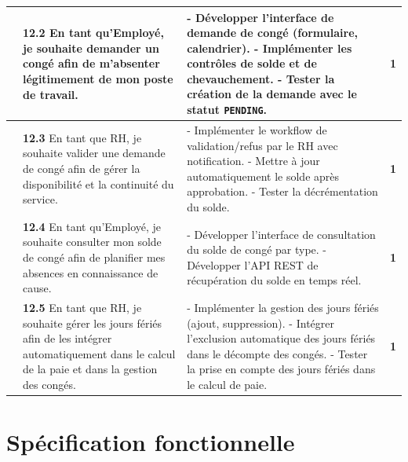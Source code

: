 \begin{small}
\begin{longtable}{|>{\raggedright\arraybackslash}p{2.8cm}|>{\raggedright\arraybackslash}p{6.2cm}|>{\raggedright\arraybackslash}p{6.2cm}|c|}
& \textbf{12.2} En tant qu'Employé, je souhaite demander un congé afin de m'absenter légitimement de mon poste de travail.
& - Développer l'interface de demande de congé (formulaire, calendrier).\newline
- Implémenter les contrôles de solde et de chevauchement.\newline
- Tester la création de la demande avec le statut \texttt{PENDING}.
& \textbf{1} \\ \cline{2-4}

& \textbf{12.3} En tant que RH, je souhaite valider une demande de congé afin de gérer la disponibilité et la continuité du service.
& - Implémenter le workflow de validation/refus par le RH avec notification.\newline
- Mettre à jour automatiquement le solde après approbation.\newline
- Tester la décrémentation du solde.
& \textbf{1} \\ \cline{2-4}

& \textbf{12.4} En tant qu'Employé, je souhaite consulter mon solde de congé afin de planifier mes absences en connaissance de cause.
& - Développer l'interface de consultation du solde de congé par type.\newline
- Développer l'API REST de récupération du solde en temps réel.
& \textbf{1} \\ \cline{2-4}

& \textbf{12.5} En tant que RH, je souhaite gérer les jours fériés afin de les intégrer automatiquement dans le calcul de la paie et dans la gestion des congés.
& - Implémenter la gestion des jours fériés (ajout, suppression).\newline
- Intégrer l'exclusion automatique des jours fériés dans le décompte des congés.\newline
- Tester la prise en compte des jours fériés dans le calcul de paie.
& \textbf{1} \\ \hline

\end{longtable}
\end{small}
\renewcommand{\arraystretch}{1.0}
\normalsize

\section{Spécification fonctionnelle}
\label{sec:s3-specification}

